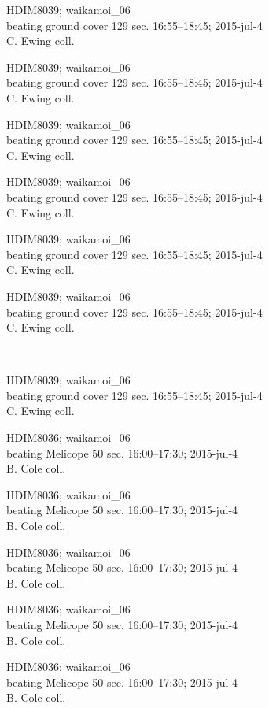 \documentclass[2pt]{extarticle}
\begin{document}
\noindent
\parbox{0.16\textwidth}{\tiny \raggedright \rule[-0.3\baselineskip]{0pt}{10pt}HDIM8039; waikamoi\_06\\ beating ground cover 129 sec. 16:55--18:45; 2015-jul-4\\ C. Ewing coll.}
\parbox{0.16\textwidth}{\tiny \raggedright \rule[-0.3\baselineskip]{0pt}{10pt}HDIM8039; waikamoi\_06\\ beating ground cover 129 sec. 16:55--18:45; 2015-jul-4\\ C. Ewing coll.}
\parbox{0.16\textwidth}{\tiny \raggedright \rule[-0.3\baselineskip]{0pt}{10pt}HDIM8039; waikamoi\_06\\ beating ground cover 129 sec. 16:55--18:45; 2015-jul-4\\ C. Ewing coll.}
\parbox{0.16\textwidth}{\tiny \raggedright \rule[-0.3\baselineskip]{0pt}{10pt}HDIM8039; waikamoi\_06\\ beating ground cover 129 sec. 16:55--18:45; 2015-jul-4\\ C. Ewing coll.}
\parbox{0.16\textwidth}{\tiny \raggedright \rule[-0.3\baselineskip]{0pt}{10pt}HDIM8039; waikamoi\_06\\ beating ground cover 129 sec. 16:55--18:45; 2015-jul-4\\ C. Ewing coll.}
\parbox{0.16\textwidth}{\tiny \raggedright \rule[-0.3\baselineskip]{0pt}{10pt}HDIM8039; waikamoi\_06\\ beating ground cover 129 sec. 16:55--18:45; 2015-jul-4\\ C. Ewing coll.} \\ 
\vspace{0.001in} 

\noindent
\parbox{0.16\textwidth}{\tiny \raggedright \rule[-0.3\baselineskip]{0pt}{10pt}HDIM8039; waikamoi\_06\\ beating ground cover 129 sec. 16:55--18:45; 2015-jul-4\\ C. Ewing coll.}
\parbox{0.16\textwidth}{\tiny \raggedright \rule[-0.3\baselineskip]{0pt}{10pt}HDIM8036; waikamoi\_06\\ beating Melicope 50 sec. 16:00--17:30; 2015-jul-4\\ B. Cole coll.}
\parbox{0.16\textwidth}{\tiny \raggedright \rule[-0.3\baselineskip]{0pt}{10pt}HDIM8036; waikamoi\_06\\ beating Melicope 50 sec. 16:00--17:30; 2015-jul-4\\ B. Cole coll.}
\parbox{0.16\textwidth}{\tiny \raggedright \rule[-0.3\baselineskip]{0pt}{10pt}HDIM8036; waikamoi\_06\\ beating Melicope 50 sec. 16:00--17:30; 2015-jul-4\\ B. Cole coll.}
\parbox{0.16\textwidth}{\tiny \raggedright \rule[-0.3\baselineskip]{0pt}{10pt}HDIM8036; waikamoi\_06\\ beating Melicope 50 sec. 16:00--17:30; 2015-jul-4\\ B. Cole coll.}
\parbox{0.16\textwidth}{\tiny \raggedright \rule[-0.3\baselineskip]{0pt}{10pt}HDIM8036; waikamoi\_06\\ beating Melicope 50 sec. 16:00--17:30; 2015-jul-4\\ B. Cole coll.} \\ 
\vspace{0.001in} 
\end{document}

